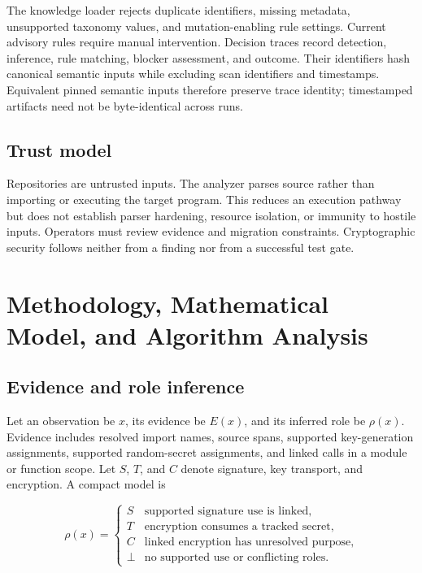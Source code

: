 \documentclass[conference,a4paper]{IEEEtran}
\begin{document}
The knowledge loader rejects duplicate identifiers, missing metadata, unsupported taxonomy values, and mutation-enabling rule settings. Current advisory rules require manual intervention. Decision traces record detection, inference, rule matching, blocker assessment, and outcome. Their identifiers hash canonical semantic inputs while excluding scan identifiers and timestamps. Equivalent pinned semantic inputs therefore preserve trace identity; timestamped artifacts need not be byte-identical across runs.

\subsection{Trust model}

Repositories are untrusted inputs. The analyzer parses source rather than importing or executing the target program. This reduces an execution pathway but does not establish parser hardening, resource isolation, or immunity to hostile inputs. Operators must review evidence and migration constraints. Cryptographic security follows neither from a finding nor from a successful test gate.

\section{Methodology, Mathematical Model, and Algorithm Analysis}

\subsection{Evidence and role inference}

Let an observation be \(x\), its evidence be \(E(x)\), and its inferred role be \(\rho(x)\). Evidence includes resolved import names, source spans, supported key-generation assignments, supported random-secret assignments, and linked calls in a module or function scope. Let \(S\), \(T\), and \(C\) denote signature, key transport, and encryption. A compact model is

\begin{equation}
\rho(x)=\begin{cases}
S & \text{supported signature use is linked},\\
T & \text{encryption consumes a tracked secret},\\
C & \text{linked encryption has unresolved purpose},\\
\bot & \text{no supported use or conflicting roles}.
\end{cases}
\end{equation}
\end{document}
